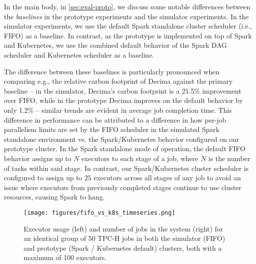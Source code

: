 In the main body, in \autoref{sec:eval-proto}, we discuss some notable  differences between the \textit{baselines} in the prototype experiments and the simulator experiments.
In the simulator experiments, we use the default Spark standalone cluster scheduler (i.e., FIFO) as a baseline.  In contrast, as the prototype is implemented on top of Spark and Kubernetes, we use the combined default behavior of the Spark DAG scheduler and Kubernetes scheduler as a baseline.  


The difference between these baselines is particularly pronounced when comparing e.g., the relative carbon footprint of Decima against the primary baseline -- in the simulator, Decima's carbon footprint is a 21.5\% improvement over FIFO, while in the prototype Decima improves on the default behavior by only 1.2\% -- similar trends are evident in average job completion time.  This difference in performance can be attributed to a difference in how per-job parallelism limits are set by the FIFO scheduler in the simulated Spark standalone environment vs. the Spark/Kubernetes behavior configured on our prototype cluster.  In the Spark standalone mode of operation, the default FIFO behavior assigns up to $N$ executors to each stage of a job, where $N$ is the number of tasks within said stage.  In contrast, our Spark/Kubernetes cluster scheduler is configured to assign up to $25$ executors across all stages of any job to avoid an issue where executors from previously completed stages continue to use cluster resources, causing Spark to hang.  

\begin{figure*}[h]
    \vspace{-1em}
    \centering
    \texttt{[image: figures/fifo\_vs\_k8s\_timeseries.png]} \vspace{-1em}
    \caption{ Executor usage (left) and number of jobs in the system (right) for an identical group of 50 TPC-H jobs in both the simulator (FIFO) and prototype (Spark / Kubernetes default) clusters, both with a maximum of 100 executors. }
    \label{fig:fifo-vs-k8s-timeseries}
\end{figure*}

